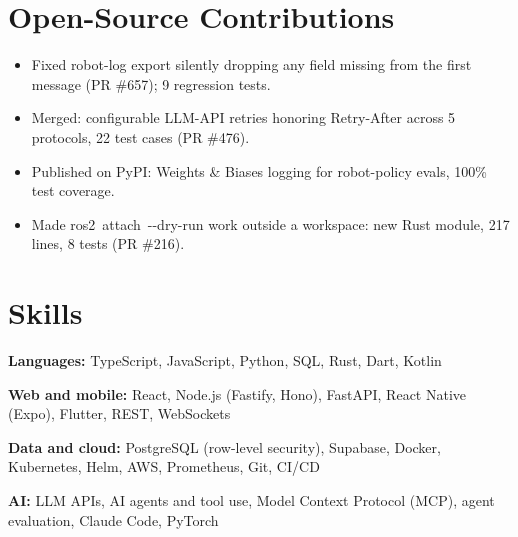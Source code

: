 \documentclass[10pt]{article}
\begin{document}
\section{Open-Source Contributions}
\begin{itemize}
\item Fixed robot-log export silently dropping any field missing from the first message (PR \#657); 9 regression tests.
\end{itemize}
\begin{itemize}
\item Merged: configurable LLM-API retries honoring Retry-After across 5 protocols, 22 test cases (PR \#476).
\item Published  on PyPI: Weights \& Biases logging for robot-policy evals, 100\% test coverage.
\end{itemize}
\begin{itemize}
\item Made \mbox{ros2 attach -{}-dry-run} work outside a workspace: new Rust module, 217 lines, 8 tests (PR \#216).
\end{itemize}

\section{Skills}
\textbf{Languages:} TypeScript, JavaScript, Python, SQL, Rust, Dart, Kotlin\par
\textbf{Web and mobile:} React, Node.js (Fastify, Hono), FastAPI, React Native (Expo), Flutter, REST, WebSockets\par
\textbf{Data and cloud:} PostgreSQL (row-level security), Supabase, Docker, Kubernetes, Helm, AWS, Prometheus, Git, CI/CD\par
\textbf{AI:} LLM APIs, AI agents and tool use, Model Context Protocol (MCP), agent evaluation, Claude Code, PyTorch\par
\end{document}
